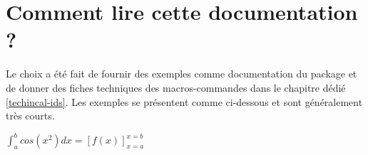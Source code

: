 \documentclass[12pt,a4paper]{book}
\newcommand\dintegrate[5]{%
  \int_{#4}^{#5} #2 d#3%
}
\newcommand\hook[5]{%
	\left[ #2 \right]_{#3=#4}^{#3=#5}%
}
\begin{document}
\section{Comment lire cette documentation ?}

Le choix a été fait de fournir des exemples comme documentation du package et de donner des fiches techniques des macros-commandes dans le chapitre dédié \ref{techincal-ids}.
Les exemples se présentent comme ci-dessous et sont généralement très courts.

\begin{latexex}
$\dintegrate*{cos(x^2)}{x}{a}{b}
 =
 \hook*{f(x)}{x}{a}{b}$
\end{latexex}
\end{document}
